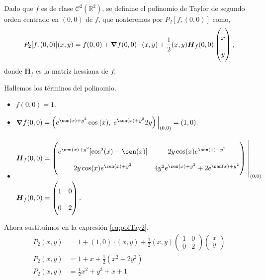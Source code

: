 \begin{solution}
    Dado que $f$ es de clase  $\mathcal{C}^2(\mathbb{R}^2)$,  se definine  el polinomio de Taylor de segundo orden centrado en $(0,0)$ de $f$, que noateremos por $P_2[f,(0,0)]$ como,
    \begin{equation}
        P_2[f,(0,0)](x,y)=f(0,0)+\grad f(0,0)\cdot(x,y)+\frac{1}{2}(x,y)\boldsymbol{H}_f(0,0)\begin{pmatrix}x\\y\end{pmatrix}, \label{eq:polTay2.3}
    \end{equation}
    donde $\boldsymbol{H}_f$ es la matriz hessiana de $f$.

    Hallemos los  términos del polinomio.

    \begin{itemize}
        \item[1.] $f(0,0)=1.$
        \item[2.] $ \grad f(0,0) = \left(e^{\sen(x)+y^2}\cos\:(x),\;e^{\sen(x)+y^2}2y\right)\Big\rvert_{(0,0)}=(1,0).$
        \item[3.] \begin{align*}
                  \boldsymbol{H}_f(0,0) & =\left(
                  \renewcommand{\arraystretch}{2} %
                  \begin{matrix}
                      e^{\sen(x)+y^2}[\cos^2(x)-\sen(x)] & 2y\cos(x)e^{\sen(x)+y^2}             \\
                      2y\cos(x)e^{\sen(x)+y^2}           & 4y^2e^{\sen(x)+y^2}+2e^{\sen(x)+y^2}
                  \end{matrix}\right)\left.\rule{0pt}{1.1cm}\right\rvert_{(0,0)} \\
                  \boldsymbol{H}_f(0,0) & =\left(\begin{matrix}
                                                         1 & 0 \\0&2
                                                     \end{matrix}\right).
              \end{align*}
    \end{itemize}

    Ahora sustituimos en la expresión \eqref{eq:polTay2}.
    \begin{align*}
        P_2(x,y) & =1+(1,0)\cdot(x,y)+\frac{1}{2}(x,y)\left(\begin{matrix}1&0\\0&2\end{matrix}\right)\begin{pmatrix}x\\y\end{pmatrix} \\
        P_2(x,y) & =1+x+\frac{1}{2}(x^2+2y^2)                                                                                         \\
        P_2(x,y) & =\frac{1}{2}x^2+y^2+x+1
    \end{align*}


\end{solution}
